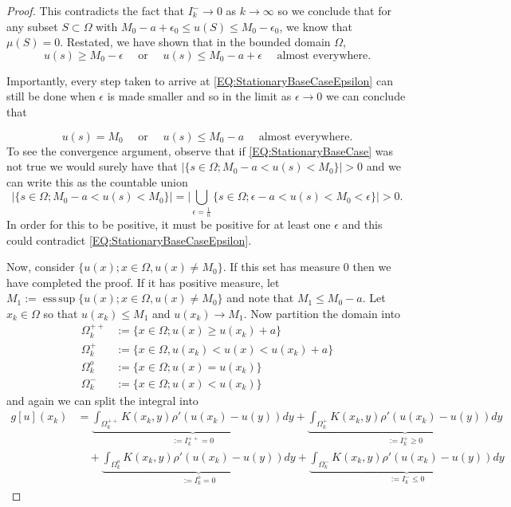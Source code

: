 \documentclass[aps,
preprint,
groupedaddress,
showkeys,
amsmath]{revtex4-2}
\DeclareMathOperator*{\esssup}{ess\,sup}
\begin{document}
\begin{proof}
        This contradicts the fact that $I^-_k\to 0$ as $k\to \infty$ so we conclude that for any subset $S\subset \Omega$ with $M_0-a+\epsilon_0\leq u(S)\leq M_0-\epsilon_0$, we know that $\mu(S)=0$. Restated, we have shown that in the bounded domain $\Omega$, 
        \begin{equation}\label{EQ:StationaryBaseCaseEpsilon} u(s)\geq M_0-\epsilon\quad\text{ or }\quad u(s)\leq M_0-a+\epsilon\quad \text{ almost everywhere.}\end{equation} 

        Importantly, every step taken to arrive at \eqref{EQ:StationaryBaseCaseEpsilon} can still be done when $\epsilon$ is made smaller and so in the limit as $\epsilon\to 0$ we can conclude that
        
        \begin{equation}\label{EQ:StationaryBaseCase} u(s) = M_0\quad\text{ or }\quad u(s)\leq M_0-a\quad \text{ almost everywhere.}\end{equation} 
        To see the convergence argument, observe that if \eqref{EQ:StationaryBaseCase} was not true we would surely have that $|\{s\in \Omega;M_0-a<u(s)<M_0\}|>0$ and we can write this as the countable union 
        \[|\{s\in \Omega;M_0-a<u(s)<M_0\}|=\bigg|\bigcup_{\epsilon=\frac{1}{n}}\{s\in\Omega; \epsilon-a<u(s)<M_0<\epsilon\}\bigg|>0.\]
        In order for this to be positive, it must be positive for at least one $\epsilon$ and this could contradict \eqref{EQ:StationaryBaseCaseEpsilon}.

        
        Now, consider $\{u(x);x\in \Omega, u(x)\neq M_0\}$. If this set has measure 0 then we have completed the proof. If it has positive measure, let $M_1:=\esssup\{u(x);x\in \Omega, u(x)\neq M_0\}$ and note that $M_1\leq M_0-a$. Let $x_k\in \Omega$ so that $u(x_k)\leq M_1$ and $u(x_k)\to M_1$. Now partition the domain into 
        \begin{equation*}
            \begin{split}
            \Omega^{++}_k&:=\{x\in \Omega; u(x)\geq u(x_k)+a\}\\
                \Omega^+_k&:=\{x\in \Omega, u(x_k)<u(x)<u(x_k)+a\}\\
            \Omega^o_k&:=\{x\in \Omega; u(x)=u(x_k)\}\\
            \Omega^-_k&:=\{x\in \Omega; u(x)<u(x_k)\}
            \end{split}
        \end{equation*}
        and again we can split the integral into
        \begin{equation*}
            \begin{split}
                g[u](x_k)& =\underbrace{\int_{\Omega^{++}_k}K(x_k,y)\rho'(u(x_k)-u(y))dy}_{:=I_k^{++}= 0}+\underbrace{\int_{\Omega^+_k}K(x_k,y)\rho'(u(x_k)-u(y))dy}_{:=I_k^+\geq 0}\\
                &\quad+\underbrace{\int_{\Omega^o_k}K(x_k,y)\rho'(u(x_k)-u(y))dy}_{:=I_k^o=0} +\underbrace{\int_{\Omega^-_k}K(x_k,y)\rho'(u(x_k)-u(y))dy}_{:=I_k^-\leq0}
            \end{split}
        \end{equation*}


\end{proof}
\end{document}
